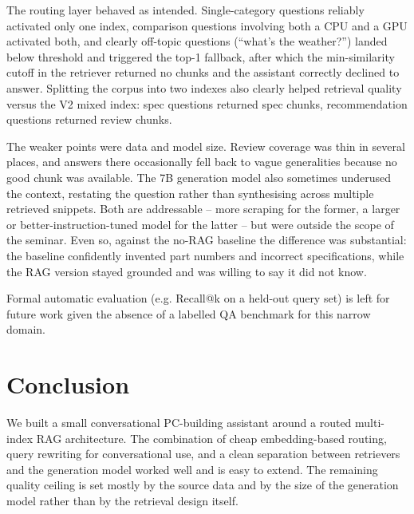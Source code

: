 \documentclass[fleqn,moreauthors,10pt]{ds_report}
\begin{document}
The routing layer behaved as intended. Single-category questions reliably activated only one index, comparison questions involving both a CPU and a GPU activated both, and clearly off-topic questions (``what's the weather?'') landed below threshold and triggered the top-1 fallback, after which the min-similarity cutoff in the retriever returned no chunks and the assistant correctly declined to answer. Splitting the corpus into two indexes also clearly helped retrieval quality versus the V2 mixed index: spec questions returned spec chunks, recommendation questions returned review chunks.
 
The weaker points were data and model size. Review coverage was thin in several places, and answers there occasionally fell back to vague generalities because no good chunk was available. The 7B generation model also sometimes underused the context, restating the question rather than synthesising across multiple retrieved snippets. Both are addressable -- more scraping for the former, a larger or better-instruction-tuned model for the latter -- but were outside the scope of the seminar. Even so, against the no-RAG baseline the difference was substantial: the baseline confidently invented part numbers and incorrect specifications, while the RAG version stayed grounded and was willing to say it did not know.

Formal automatic evaluation (e.g. Recall@k on a held-out query set) is left for future work given the absence of a labelled QA benchmark for this narrow domain.

\section{Conclusion}
 
We built a small conversational PC-building assistant around a routed multi-index RAG architecture. The combination of cheap embedding-based routing, query rewriting for conversational use, and a clean separation between retrievers and the generation model worked well and is easy to extend. The remaining quality ceiling is set mostly by the source data and by the size of the generation model rather than by the retrieval design itself.



\end{document}
